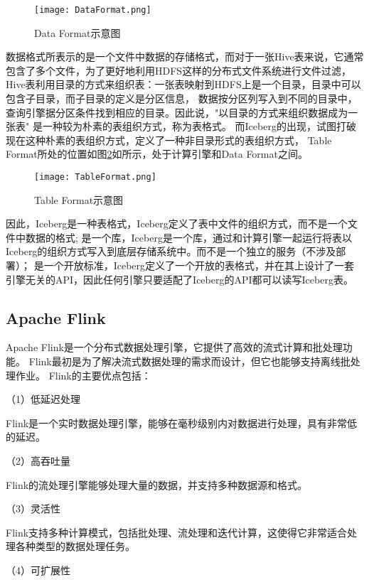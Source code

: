\begin{figure}[H]
  \centering
  \texttt{[image: DataFormat.png]}
  \caption{Data Format示意图}
  \label{fig:DataFormat}
\end{figure}

数据格式所表示的是一个文件中数据的存储格式，而对于一张Hive表来说，它通常包含了多个文件，为了更好地利用HDFS\cite{13}这样的分布式文件系统进行文件过滤，
Hive表利用目录的方式来组织表：一张表映射到HDFS上是一个目录，目录中可以包含子目录，而子目录的定义是分区信息，
数据按分区列写入到不同的目录中，查询引擎据分区条件找到相应的目录。因此说，"以目录的方式来组织数据成为一张表"
是一种较为朴素的表组织方式，称为表格式。
而Iceberg的出现，试图打破现在这种朴素的表组织方式，定义了一种非目录形式的表组织方式，
Table Format所处的位置如图\ref{fig:TableFormat}如所示，处于计算引擎和Data Format之间。

\begin{figure}[H]
  \centering
  \texttt{[image: TableFormat.png]}
  \caption{Table Format示意图}
  \label{fig:TableFormat}
\end{figure}

因此，Iceberg是一种表格式，Iceberg定义了表中文件的组织方式，而不是一个文件中数据的格式;
是一个库，Iceberg是一个库，通过和计算引擎一起运行将表以Iceberg的组织方式写入到底层存储系统中\cite{26}。而不是一个独立的服务（不涉及部署）；
是一个开放标准，Iceberg定义了一个开放的表格式，并在其上设计了一套引擎无关的API，因此任何引擎只要适配了Iceberg的API都可以读写Iceberg表。

\subsection{Apache Flink}

Apache Flink是一个分布式数据处理引擎，它提供了高效的流式计算和批处理功能。
Flink最初是为了解决流式数据处理的需求而设计，但它也能够支持离线批处理作业\cite{24}。
Flink的主要优点包括：

（1）低延迟处理

Flink是一个实时数据处理引擎，能够在毫秒级别内对数据进行处理，具有非常低的延迟。

（2）高吞吐量

Flink的流处理引擎能够处理大量的数据，并支持多种数据源和格式。

（3）灵活性

Flink支持多种计算模式，包括批处理、流处理和迭代计算，这使得它非常适合处理各种类型的数据处理任务。

（4）可扩展性

